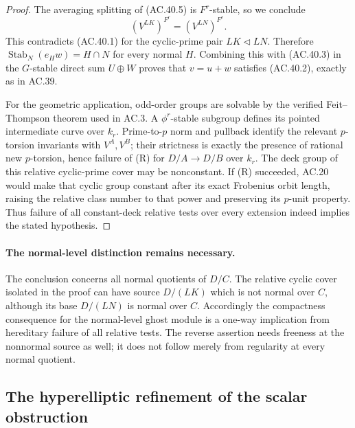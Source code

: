 \begin{proof}
The averaging splitting of (AC.40.5) is \(F^r\)-stable,
so we conclude
\[
                         (V^{LK})^{F^r}=(V^{LN})^{F^r}.
\]
This contradicts (AC.40.1) for the cyclic-prime pair
\(LK\triangleleft LN\). Therefore
\(\operatorname{Stab}_N(e_Hw)=H\cap N\) for every normal
\(H\). Combining this with (AC.40.3) in the
\(G\)-stable direct sum \(U\oplus W\) proves that
\(v=u+w\) satisfies (AC.40.2), exactly as in AC.39.

For the geometric application, odd-order groups are solvable
by the verified Feit--Thompson theorem used in AC.3.
A \(\phi^r\)-stable
subgroup defines its pointed intermediate curve over
\(k_r\). Prime-to-\(p\) norm and pullback identify
the relevant \(p\)-torsion invariants with
\(V^A,V^B\); their strictness is exactly the presence
of rational new \(p\)-torsion, hence failure of (R)
for \(D/A\to D/B\) over \(k_r\). The deck group of
this relative cyclic-prime cover may be nonconstant.
If (R) succeeded, AC.20 would make that cyclic group
constant after its exact Frobenius orbit length,
raising the relative class number to that power and
preserving its \(p\)-unit property. Thus failure of
all constant-deck relative tests over every extension
indeed implies the stated hypothesis.
\end{proof}

\paragraph{The normal-level distinction remains necessary.}
The conclusion concerns all normal quotients of \(D/C\).
The relative cyclic cover isolated in the proof can
have source \(D/(LK)\) which is not normal over \(C\),
although its base \(D/(LN)\) is normal over \(C\).
Accordingly the compactness consequence for the
normal-level ghost module is a one-way implication
from hereditary failure of all relative tests.
The reverse assertion needs freeness at the nonnormal
source as well; it does not follow merely from
regularity at every normal quotient.


\subsection{The hyperelliptic refinement of the scalar obstruction}

